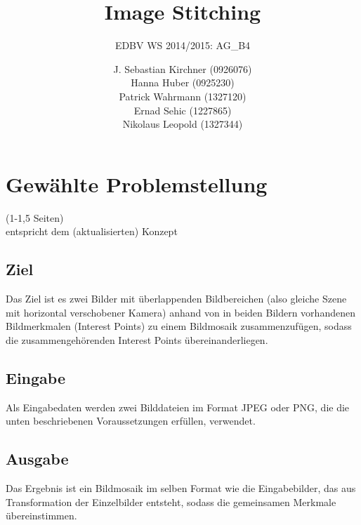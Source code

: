 \documentclass[deutsch]{scrartcl}
\begin{document}
\title{Image Stitching} 

\subtitle{EDBV WS 2014/2015: AG\_B4} 

\author{J. Sebastian Kirchner (0926076)\\
	Hanna Huber (0925230)\\
	Patrick Wahrmann (1327120)\\
	Ernad Sehic (1227865)\\
	Nikolaus Leopold (1327344)}


\maketitle

\section{Gewählte Problemstellung}
(1-1,5 Seiten)\\
entspricht dem (aktualisierten) Konzept
\subsection{Ziel}
Das Ziel ist es zwei Bilder mit überlappenden Bildbereichen (also gleiche Szene mit horizontal verschobener Kamera) anhand von in beiden Bildern vorhandenen Bildmerkmalen (Interest Points) zu einem Bildmosaik zusammenzufügen, sodass die zusammengehörenden Interest Points übereinanderliegen.

\subsection{Eingabe}
Als Eingabedaten werden zwei Bilddateien im Format JPEG oder PNG, die die unten beschriebenen Voraussetzungen erfüllen, verwendet.

\subsection{Ausgabe}
Das Ergebnis ist ein Bildmosaik im selben Format wie die Eingabebilder, das aus Transformation der Einzelbilder entsteht, sodass die gemeinsamen Merkmale übereinstimmen.
\end{document}
